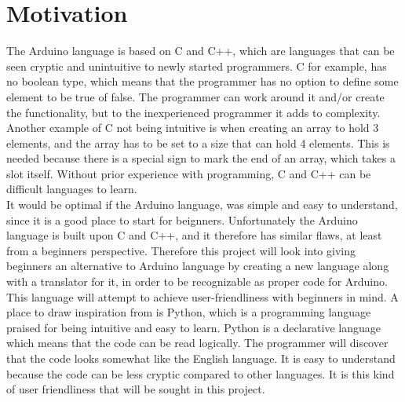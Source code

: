 \section{Motivation}\label{introduction:motivation}
The Arduino language is based on C and C++, which are languages that can be seen cryptic and unintuitive to newly started programmers. C for example, has no boolean type, which means that the programmer has no option to define some element to be true of false. The programmer can work around it and/or create the functionality, but to the inexperienced programmer it adds to complexity. Another example of C not being intuitive is when creating an array to hold 3 elements, and the array has to be set to a size that can hold 4 elements. This is needed because there is a special sign to mark the end of an array, which takes a slot itself.  Without prior experience with programming, C and C++ can be difficult languages to learn. \\

It would be optimal if the Arduino language, was simple and easy to understand, since it is a good place to start for beignners. Unfortunately the Arduino language is built upon C and C++, and it therefore has similar flaws, at least from a beginners perspective. Therefore this project will look into giving beginners an alternative to Arduino language by creating a new language along with a translator for it, in order to be recognizable as proper code for Arduino. This language will attempt to achieve user-friendliness with beginners in mind. A place to draw inspiration from is Python, which is a programming language praised for being intuitive and easy to learn. \cite{python:about} Python is a declarative language which means that the code can be read logically. The programmer will discover that the code looks somewhat like the English language. It is easy to understand because the code can be less cryptic compared to other languages. It is this kind of user friendliness that will be sought in this project.